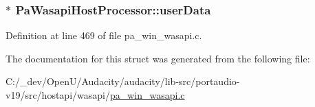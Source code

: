 \subsubsection[{\texorpdfstring{user\+Data}{userData}}]{$\ast$ Pa\+Wasapi\+Host\+Processor\+::user\+Data}\hypertarget{struct_pa_wasapi_host_processor_abb4a8d12910d22829a9e75159b379298}{}\label{struct_pa_wasapi_host_processor_abb4a8d12910d22829a9e75159b379298}


Definition at line 469 of file pa\+\_\+win\+\_\+wasapi.\+c.



The documentation for this struct was generated from the following file\+:\begin{DoxyCompactItemize}
\item 
C\+:/\+\_\+dev/\+Open\+U/\+Audacity/audacity/lib-\/src/portaudio-\/v19/src/hostapi/wasapi/\hyperlink{pa__win__wasapi_8c}{pa\+\_\+win\+\_\+wasapi.\+c}\end{DoxyCompactItemize}
